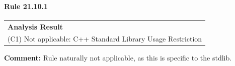 \paragraph{Rule 21.10.1}
\begin{longtable}{p{13cm}}
\textbf{Analysis Result} \\
(C1) Not applicable: C++ Standard Library Usage Restriction \\
\end{longtable}
\textbf{Comment:} Rule naturally not applicable, as this is specific to the \Cpp stdlib. \\
